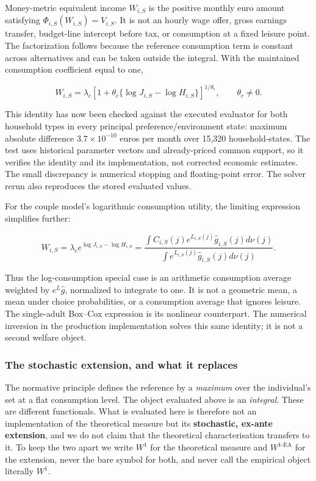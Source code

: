 \documentclass[11pt,a4paper]{article}
\begin{document}
Money-metric equivalent income \(W_{i,S}\) is the positive monthly euro amount satisfying \(\Phi_{i,S}(W_{i,S})=V_{i,S}\). It is not an hourly wage offer, gross earnings transfer, budget-line intercept before tax, or consumption at a fixed leisure point. The factorization follows because the reference consumption term is constant across alternatives and can be taken outside the integral. With the maintained consumption coefficient equal to one,

\[\boxed{W_{i,S}=\lambda_c\left[1+\theta_c\{\log J_{i,S}-\log H_{i,S}\}\right]^{1/\theta_c}},\qquad\theta_c\ne0.\]

This identity has now been checked against the executed evaluator for both household types in every principal preference/environment state: maximum absolute difference \(3.7\times10^{-10}\) euros per month over 15,320 household-states. The test uses historical parameter vectors and already-priced common support, so it verifies the identity and its implementation, not corrected economic estimates. The small discrepancy is numerical stopping and floating-point error. The solver rerun also reproduces the stored evaluated values.

For the couple model's logarithmic consumption utility, the limiting expression simplifies further:

\[\boxed{W_{i,S}=\lambda_c e^{\log J_{i,S}-\log H_{i,S}}
=\frac{\int C_{i,S}(j)e^{L_{i,S}(j)}\widehat g_{i,S}(j)d\nu(j)}
{\int e^{L_{i,S}(j)}\widehat g_{i,S}(j)d\nu(j)}}.\]

Thus the log-consumption special case is an arithmetic consumption average weighted by \(e^L\widehat g\), normalized to integrate to one. It is not a geometric mean, a mean under choice probabilities, or a consumption average that ignores leisure. The single-adult Box--Cox expression is its nonlinear counterpart. The numerical inversion in the production implementation solves this same identity; it is not a second welfare object.

\subsubsection{The stochastic extension, and what it replaces}\label{the-stochastic-extension-and-what-it-replaces}

The normative principle defines the reference by a \emph{maximum} over the individual's set at a flat consumption level. The object evaluated above is an \emph{integral}. These are different functionals. What is evaluated here is therefore not an implementation of the theoretical measure but its \textbf{stochastic, ex-ante extension}, and we do not claim that the theoretical characterisation transfers to it. To keep the two apart we write \(W^1\) for the theoretical measure and \(W^{1\text{-EA}}\) for the extension, never the bare symbol for both, and never call the empirical object literally \(W^1\).
\end{document}
